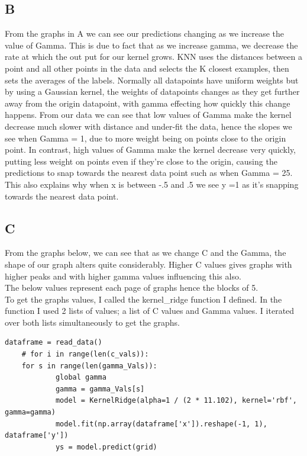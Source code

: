 \documentclass[11pt]{article} %
\begin{document}
\subsection{B}
From the graphs in A we can see our predictions changing as we increase the value of Gamma. This is due to fact that as we increase gamma, we decrease the rate at which the out put for our kernel grows. KNN uses the distances between a point and all other points in the data and selects the K closest examples, then sets the averages of the labels. Normally all datapoints have uniform weights but by using a Gaussian kernel, the weights of datapoints changes as they get further away from the origin datapoint, with gamma effecting how quickly this change happens. From our data we can see that low values of Gamma make the kernel decrease much slower with distance and under-fit the data, hence the slopes we see when Gamma = 1, due to more weight being on points close to the origin point. In contrast, high values of Gamma make the kernel decrease very quickly, putting less weight on points even if they're close to the origin, causing the predictions to snap towards the nearest data point such as when Gamma = 25. This also explains why when x is between -.5 and .5 we see y =1 as it's snapping towards the nearest data point. 

\subsection{C}
From the graphs below, we can see that as we change C and the Gamma, the shape of our graph alters quite considerably. Higher C values gives graphs with higher peaks and with higher gamma values influencing this also. \\ The below values represent each page of graphs hence the blocks of 5. \\ To get the graphs values, I called the kernel\_ridge function I defined. In the function I used 2 lists of values; a list of C values and Gamma values. I iterated over both lists simultaneously to get the graphs.  
\begin{verbatim}
dataframe = read_data()
    # for i in range(len(c_vals)):
    for s in range(len(gamma_Vals)):
            global gamma
            gamma = gamma_Vals[s]
            model = KernelRidge(alpha=1 / (2 * 11.102), kernel='rbf', gamma=gamma)
            model.fit(np.array(dataframe['x']).reshape(-1, 1), dataframe['y'])
            ys = model.predict(grid)
\end{verbatim}
\end{document}
